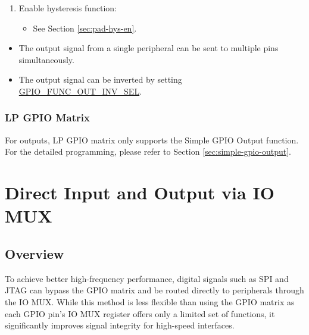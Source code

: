 \documentclass[main\_\_EN.tex]{subfiles}
\begin{document}
\begin{enumerate}
\begin{itemize}
        \item Set the \hyperref[fielddesc:IOMUXGPIONFUNDRV]{IO\_MUX\_GPIO\_FUN\_DRV} field to the desired value for output strength (0$\sim$3). The higher the drive strength, the more current can be sourced/sunk from the pin.
        \item If using open drain mode, set or clear the \hyperref[fielddesc:IOMUXGPIONFUNWPU]{IO\_MUX\_GPIO\_FUN\_WPU} and \hyperref[fielddesc:IOMUXGPIONFUNWPD]{IO\_MUX\_GPIO\_FUN\_WPD} bits to enable or disable the internal pull-up and pull-down resistors.
    \end{itemize}
    \item Enable hysteresis function:
    \begin{itemize}
        \item See Section \ref{sec:pad-hys-en}.
    \end{itemize}
\end{enumerate}

\begin{tiplisting}
\vspace{-2em}
\begin{itemize}
\item The output signal from a single peripheral can be sent to multiple pins simultaneously.
\item The output signal can be inverted by setting \hyperref[fielddesc:GPIOFUNCNOUTINVSEL]{GPIO\_FUNC\_OUT\_INV\_SEL}.
\end{itemize}
\end{tiplisting}

\subsubsection{LP GPIO Matrix}

For outputs, LP GPIO matrix only supports the Simple GPIO Output function. For the detailed programming, please refer to Section \ref{sec:simple-gpio-output}.

\section{Direct Input and Output via IO MUX}

\subsection{Overview}

To achieve better high-frequency performance, digital signals such as SPI and JTAG can bypass the GPIO matrix and be routed directly to peripherals through the IO MUX. While this method is less flexible than using the GPIO matrix as each GPIO pin's IO MUX register offers only a limited set of functions, it significantly improves signal integrity for high-speed interfaces.
\end{document}
